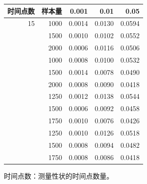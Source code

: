 \begin{table}[htbp]
\centering
{}
\label{tab:ch03-03}
\begin{tabular}{rrrrr}
\toprule
时间点数 & 样本量 & 0.001 & 0.01 & 0.05\\
\midrule
15 & 1000 & 0.0014 & 0.0130 & 0.0594\\
 & 1500 & 0.0010 & 0.0102 & 0.0552\\
 & 2000 & 0.0006 & 0.0116 & 0.0506\\
\addlinespace
20 & 1000 & 0.0008 & 0.0100 & 0.0532\\
 & 1500 & 0.0014 & 0.0078 & 0.0490\\
 & 2000 & 0.0008 & 0.0090 & 0.0418\\
\addlinespace
30 & 1250 & 0.0012 & 0.0138 & 0.0544\\
 & 1500 & 0.0006 & 0.0092 & 0.0458\\
 & 1750 & 0.0010 & 0.0076 & 0.0426\\
\addlinespace
40 & 1250 & 0.0010 & 0.0126 & 0.0518\\
 & 1500 & 0.0008 & 0.0094 & 0.0482\\
 & 1750 & 0.0008 & 0.0086 & 0.0418\\
\bottomrule
\end{tabular}
\par\smallskip
\begin{minipage}{0.8\textwidth}\footnotesize
时间点数：测量性状的时间点数量。
\end{minipage}
\end{table}
